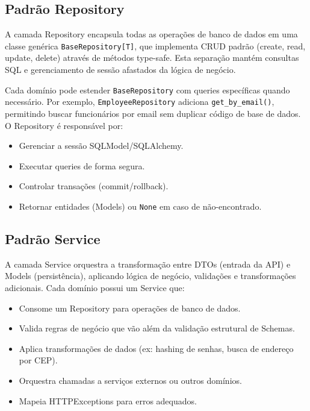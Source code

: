 \subsection{Padrão Repository}

\hspace{0.5cm} A camada Repository encapsula todas as operações de banco de dados em uma classe genérica
\texttt{BaseRepository[T]}, que implementa CRUD padrão (create, read, update, delete) através de métodos type-safe.
Esta separação mantém consultas SQL e gerenciamento de sessão afastados da lógica de negócio.

Cada domínio pode estender \texttt{BaseRepository} com queries específicas quando necessário. Por exemplo,
\texttt{EmployeeRepository} adiciona \texttt{get\_by\_email()}, permitindo buscar funcionários por email sem duplicar
código de base de dados. O Repository é responsável por:

\begin{itemize}
  \item Gerenciar a sessão SQLModel/SQLAlchemy.
  \item Executar queries de forma segura.
  \item Controlar transações (commit/rollback).
  \item Retornar entidades (Models) ou \texttt{None} em caso de não-encontrado.
\end{itemize}

\subsection{Padrão Service}

\hspace{0.5cm} A camada Service orquestra a transformação entre DTOs (entrada da API) e Models (persistência),
aplicando lógica de negócio, validações e transformações adicionais. Cada domínio possui um Service que:

\begin{itemize}
  \item Consome um Repository para operações de banco de dados.
  \item Valida regras de negócio que vão além da validação estrutural de Schemas.
  \item Aplica transformações de dados (ex: hashing de senhas, busca de endereço por CEP).
  \item Orquestra chamadas a serviços externos ou outros domínios.
  \item Mapeia HTTPExceptions para erros adequados.
\end{itemize}

